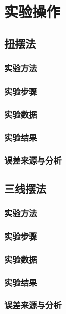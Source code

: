 \documentclass[12pt,hyperref,a4paper,UTF8]{ctexart}
\begin{document}
\section{实验操作}
\subsection{扭摆法}
\subsubsection{实验方法}

\subsubsection{实验步骤}

\subsubsection{实验数据}

\subsubsection{实验结果}

\subsubsection{误差来源与分析}

\subsection{三线摆法}
\subsubsection{实验方法}

\subsubsection{实验步骤}

\subsubsection{实验数据}

\subsubsection{实验结果}

\subsubsection{误差来源与分析}
\end{document}
